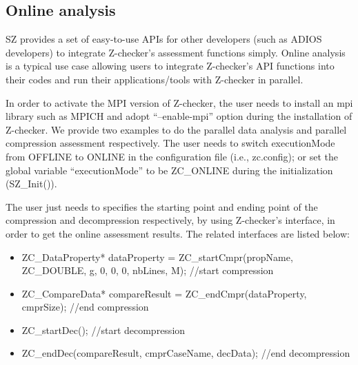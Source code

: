 \subsection{Online analysis}

SZ provides a set of easy-to-use APIs for other developers (such as ADIOS developers) to integrate Z-checker's assessment functions simply. Online analysis is a typical use case allowing users to integrate Z-checker's API functions into their codes and run their applications/tools with Z-checker in parallel.

In order to activate the MPI version of Z-checker, the user needs to install an mpi library such as MPICH and adopt ``--enable-mpi'' option during the installation of Z-checker. We provide two examples to do the parallel data analysis and parallel compression assessment respectively. The user needs to switch executionMode from OFFLINE to ONLINE in the configuration file (i.e., zc.config); or set the global variable ``executionMode'' to be ZC\_ONLINE during the initialization (SZ\_Init()). 

The user just needs to specifies the starting point and ending point of the compression and decompression respectively, by using Z-checker's interface, in order to get the online assessment results. The related interfaces are listed below: 
\begin{itemize}
  \item ZC\_DataProperty* dataProperty = ZC\_startCmpr(propName, ZC\_DOUBLE, g, 0, 0, 0, nbLines, M); //start compression
  \item ZC\_CompareData* compareResult = ZC\_endCmpr(dataProperty, cmprSize); //end compression
  \item ZC\_startDec(); //start decompression
  \item ZC\_endDec(compareResult, cmprCaseName, decData); //end decompression
\end{itemize}

